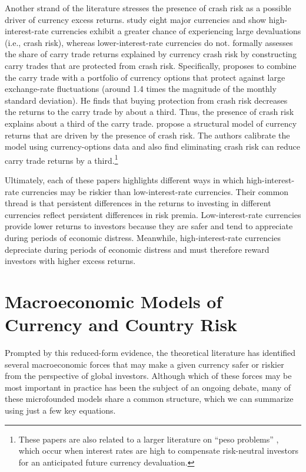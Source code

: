 \documentclass[11pt]{article}
\begin{document}
Another strand of the literature stresses the presence of crash risk as a possible driver of currency excess returns. \citet{Brunnermeieretal2009} study eight major currencies and show high-interest-rate currencies exhibit a greater chance of experiencing large devaluations (i.e., crash risk), whereas lower-interest-rate currencies do not. \citet{Jurek2014} formally assesses the share of carry trade returns explained by currency crash risk by constructing carry trades that are protected from crash risk. Specifically, \citet{Jurek2014} proposes to combine the carry trade with a portfolio of currency options that protect against large exchange-rate fluctuations (around 1.4 times the magnitude of the monthly standard deviation). He finds that buying protection from crash risk decreases the returns to the carry trade by about a third. Thus, the presence of crash risk explains about a third of the carry trade. \citet{Farhietal2015} propose a structural model of currency returns that are driven by the presence of crash risk. The authors calibrate the model using currency-options data and also find eliminating crash risk can reduce carry trade returns by a third.\footnote{These papers are also related to a larger literature on ``peso problems'' \citep{Lewis2011}, which occur when interest rates are high to compensate risk-neutral investors for an anticipated future currency devaluation.}

Ultimately, each of these papers highlights different ways in which high-interest-rate currencies may be riskier than low-interest-rate currencies. Their common thread is that persistent differences in the returns to investing in different currencies reflect persistent differences in risk premia. Low-interest-rate currencies provide lower returns to investors because they are safer and tend to appreciate during periods of economic distress. Meanwhile, high-interest-rate currencies depreciate during periods of economic distress and must therefore reward investors with higher excess returns.



\section{Macroeconomic Models of Currency and Country Risk\label{sec_theory}}

Prompted by this reduced-form evidence, the theoretical literature has identified several macroeconomic forces that may make a given currency safer or riskier from the perspective of global investors. Although which of these forces may be most important in practice has been the subject of an ongoing debate, many of these microfounded models share a common structure, which we can summarize using just a few key equations.
\end{document}
